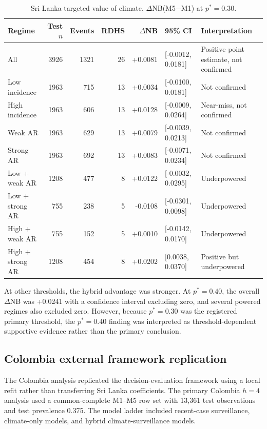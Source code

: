 \documentclass[11pt,a4paper]{article}
\begin{document}
\begin{table}[htbp]
\centering
\caption{Sri Lanka targeted value of climate, $\Delta$NB(M5$-$M1) at $p^*=0.30$.}
\label{tab:srilanka-targeted-value}
\small
\begin{tabular}{lrrrrll}
\toprule
Regime & Test $n$ & Events & RDHS & $\Delta$NB & 95\% CI & Interpretation \\
\midrule
All & 3926 & 1321 & 26 & +0.0081 & [-0.0012, 0.0181] & Positive point estimate, not confirmed \\
Low incidence & 1963 & 715 & 13 & +0.0034 & [-0.0100, 0.0181] & Not confirmed \\
High incidence & 1963 & 606 & 13 & +0.0128 & [-0.0009, 0.0264] & Near-miss, not confirmed \\
Weak AR & 1963 & 629 & 13 & +0.0079 & [-0.0039, 0.0213] & Not confirmed \\
Strong AR & 1963 & 692 & 13 & +0.0083 & [-0.0071, 0.0234] & Not confirmed \\
Low + weak AR & 1208 & 477 & 8 & +0.0122 & [-0.0032, 0.0295] & Underpowered \\
Low + strong AR & 755 & 238 & 5 & -0.0108 & [-0.0301, 0.0098] & Underpowered \\
High + weak AR & 755 & 152 & 5 & +0.0010 & [-0.0142, 0.0170] & Underpowered \\
High + strong AR & 1208 & 454 & 8 & +0.0202 & [0.0038, 0.0370] & Positive but underpowered \\
\bottomrule
\end{tabular}
\end{table}

At other thresholds, the hybrid advantage was stronger. At $p^*=0.40$, the overall $\Delta$NB was +0.0241 with a confidence interval excluding zero, and several powered regimes also excluded zero. However, because $p^*=0.30$ was the registered primary threshold, the $p^*=0.40$ finding was interpreted as threshold-dependent supportive evidence rather than the primary conclusion.

\subsection{Colombia external framework replication}
\label{subsec:colombia-replication}

The Colombia analysis replicated the decision-evaluation framework using a local refit rather than transferring Sri Lanka coefficients. The primary Colombia $h=4$ analysis used a common-complete M1--M5 row set with 13,361 test observations and test prevalence 0.375. The model ladder included recent-case surveillance, climate-only models, and hybrid climate-surveillance models.
\end{document}
